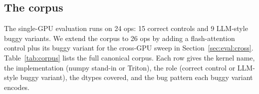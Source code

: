 \documentclass[runningheads]{llncs}
\begin{document}
\subsection{The corpus}
\label{sec:method:corpus}

The single-GPU evaluation runs on 24 ops: 15 correct controls and 9
LLM-style buggy variants. We extend the corpus to 26 ops by adding a
flash-attention control plus its buggy variant for the cross-GPU
sweep in Section~\ref{sec:eval:cross}. Table~\ref{tab:corpus} lists
the full canonical corpus. Each row gives the kernel name, the
implementation (numpy stand-in or Triton), the role (correct control
or LLM-style buggy variant), the dtypes covered, and the bug pattern
each buggy variant encodes.

\begin{table}[h]
\centering
\caption{Canonical corpus. 16 controls and 10 LLM-style buggy variants
across 26 kernel entries. The single-GPU evaluation
(Section~\ref{sec:eval}) runs on rows 1--24; the cross-GPU sweep
(Section~\ref{sec:eval:cross}) extends to rows 25--26 (flash-attention
pair).}
\label{tab:corpus}
\end{table}
\end{document}
